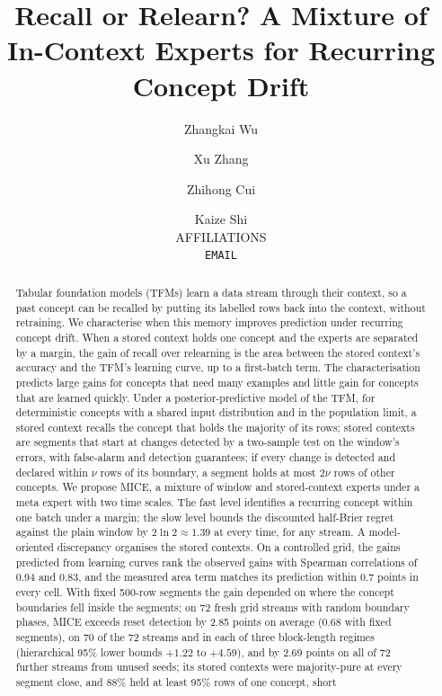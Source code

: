 \documentclass[11pt]{article}
\theoremstyle{plain}
\theoremstyle{definition}
\theoremstyle{remark}
\newcommand{\method}{\textsc{MICE}}   %
\begin{document}
\title{Recall or Relearn? A Mixture of In-Context Experts for Recurring Concept Drift}
\author{%
  Zhangkai Wu \and Xu Zhang \and Zhihong Cui \and Kaize Shi\\[4pt]
  \normalsize AFFILIATIONS\\
  \normalsize\texttt{EMAIL}
}
\maketitle
\begin{abstract}
Tabular foundation models (TFMs) learn a data stream through their context, so a past concept can be recalled by
putting its labelled rows back into the context, without retraining. We characterise when this memory improves
prediction under recurring concept drift. When a stored context holds one concept and the experts are separated by a
margin, the gain of recall over relearning is the area between the stored context's accuracy and the TFM's learning
curve, up to a first-batch term. The characterisation predicts large gains for concepts that need many examples and
little gain for concepts that are learned quickly. Under a posterior-predictive model of the TFM, for deterministic concepts with a shared input distribution and in the
population limit, a stored context recalls the concept that holds the majority of its rows; stored contexts are segments that start at changes detected by a two-sample test on the window's
errors, with false-alarm and detection guarantees; if every change is detected and declared within $\nu$ rows of its
boundary, a segment holds at most $2\nu$ rows of other concepts. We propose \method{}, a mixture of window and stored-context experts
under a meta expert with two time scales. The fast level identifies a recurring concept within one batch under a
margin; the slow level bounds the discounted half-Brier regret against the plain window by $2\ln2\approx1.39$ at every
time, for any stream. A model-oriented discrepancy organises the stored contexts. On a controlled grid, the gains
predicted from learning curves rank the observed gains with Spearman correlations of 0.94 and 0.83, and the
measured area term matches its prediction within 0.7 points in every cell. With fixed 500-row segments the gain
depended on where the concept boundaries fell inside the segments; on 72 fresh grid streams with random boundary
phases, \method{} exceeds reset detection by 2.85 points on average (0.68 with fixed segments), on 70 of the 72
streams and in each of three block-length regimes (hierarchical 95\% lower bounds $+1.22$ to $+4.59$), and by 2.69 points on all of 72 further streams from unused seeds; its stored contexts were majority-pure at every segment close, and 88\% held at least 95\% rows of one concept, short

\end{abstract}
\end{document}
